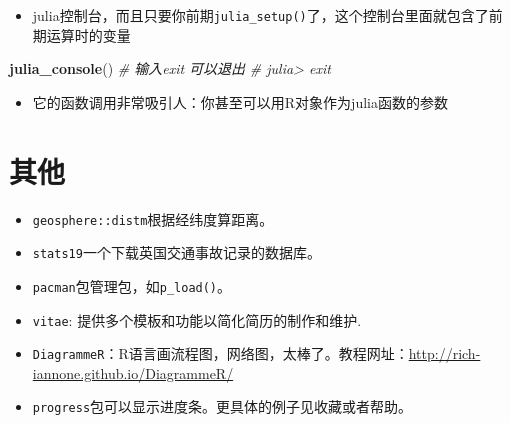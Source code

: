 \documentclass[
]{book}
\newenvironment{Shaded}{\begin{snugshade}}{\end{snugshade}}
\newcommand{\CommentTok}[1]{\textcolor[rgb]{0.56,0.35,0.01}{\textit{#1}}}
\newcommand{\ControlFlowTok}[1]{\textcolor[rgb]{0.13,0.29,0.53}{\textbf{#1}}}
\newcommand{\DataTypeTok}[1]{\textcolor[rgb]{0.13,0.29,0.53}{#1}}
\newcommand{\DecValTok}[1]{\textcolor[rgb]{0.00,0.00,0.81}{#1}}
\newcommand{\FloatTok}[1]{\textcolor[rgb]{0.00,0.00,0.81}{#1}}
\newcommand{\KeywordTok}[1]{\textcolor[rgb]{0.13,0.29,0.53}{\textbf{#1}}}
\newcommand{\NormalTok}[1]{#1}
\newcommand{\OperatorTok}[1]{\textcolor[rgb]{0.81,0.36,0.00}{\textbf{#1}}}
\newcommand{\StringTok}[1]{\textcolor[rgb]{0.31,0.60,0.02}{#1}}
\providecommand{\tightlist}{%
  \setlength{\itemsep}{0pt}\setlength{\parskip}{0pt}}
\begin{document}
\begin{itemize}
\tightlist
\item
  julia控制台，而且只要你前期\texttt{julia\_setup()}了，这个控制台里面就包含了前期运算时的变量
\end{itemize}

\begin{Shaded}
\begin{Highlighting}[]
\KeywordTok{julia_console}\NormalTok{()}
\CommentTok{# 输入exit 可以退出}
\CommentTok{# julia> exit}
\end{Highlighting}
\end{Shaded}

\begin{itemize}
\tightlist
\item
  它的函数调用非常吸引人：你甚至可以用R对象作为julia函数的参数
\end{itemize}

\begin{Shaded}
\end{Shaded}

\hypertarget{ux5176ux4ed6-1}{%
\chapter{其他}\label{ux5176ux4ed6-1}}

\begin{itemize}
\tightlist
\item
  \texttt{geosphere::distm}根据经纬度算距离。
\item
  \texttt{stats19}一个下载英国交通事故记录的数据库。
\item
  \texttt{pacman}包管理包，如\texttt{p\_load()}。
\item
  \texttt{vitae}: 提供多个模板和功能以简化简历的制作和维护.
\item
  \texttt{DiagrammeR}：R语言画流程图，网络图，太棒了。教程网址：\url{http://rich-iannone.github.io/DiagrammeR/}
\item
  \texttt{progress}包可以显示进度条。更具体的例子见收藏或者帮助。
\end{itemize}
\end{document}
